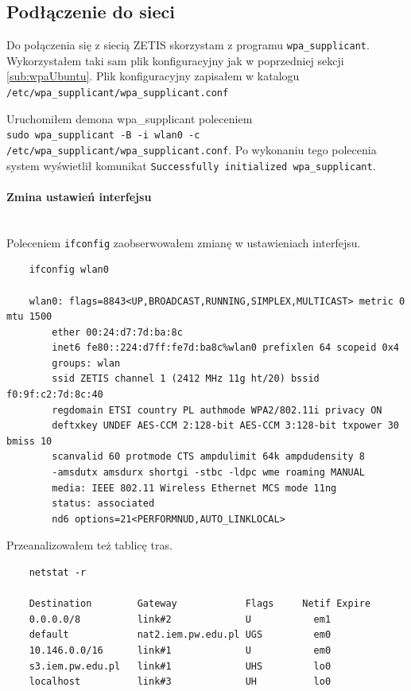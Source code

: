 \documentclass{article} %
\begin{document}
\subsection{Podłączenie do sieci}
Do połączenia się z siecią ZETIS skorzystam z programu \texttt{wpa\_supplicant}.
Wykorzystałem taki sam plik konfiguracyjny jak w poprzedniej sekcji \ref{sub:wpaUbuntu}.
Plik konfiguracyjny zapisałem w katalogu \texttt{/etc/wpa\_supplicant/wpa\_supplicant.conf}

\vspace{5 mm}
Uruchomiłem demona wpa\_supplicant poleceniem \\\texttt{sudo wpa\_supplicant -B -i wlan0 -c /etc/wpa\_supplicant/wpa\_supplicant.conf}.
Po wykonaniu tego polecenia system wyświetlił komunikat \texttt{Successfully initialized wpa\_supplicant}.

\paragraph{Zmina ustawień interfejsu} \mbox{} \\
Poleceniem \texttt{ifconfig} zaobserwowałem zmianę w ustawieniach interfejsu.
\begin{lstlisting}
    ifconfig wlan0

    wlan0: flags=8843<UP,BROADCAST,RUNNING,SIMPLEX,MULTICAST> metric 0 mtu 1500 
        ether 00:24:d7:7d:ba:8c
        inet6 fe80::224:d7ff:fe7d:ba8c%wlan0 prefixlen 64 scopeid 0x4
        groups: wlan
        ssid ZETIS channel 1 (2412 MHz 11g ht/20) bssid f0:9f:c2:7d:8c:40
        regdomain ETSI country PL authmode WPA2/802.11i privacy ON
        deftxkey UNDEF AES-CCM 2:128-bit AES-CCM 3:128-bit txpower 30 bmiss 10
        scanvalid 60 protmode CTS ampdulimit 64k ampdudensity 8
        -amsdutx amsdurx shortgi -stbc -ldpc wme roaming MANUAL
        media: IEEE 802.11 Wireless Ethernet MCS mode 11ng
        status: associated
        nd6 options=21<PERFORMNUD,AUTO_LINKLOCAL>
\end{lstlisting}

Przeanalizowałem też tablicę tras.
\begin{lstlisting}
    netstat -r

    Destination        Gateway            Flags     Netif Expire 
    0.0.0.0/8          link#2             U           em1        
    default            nat2.iem.pw.edu.pl UGS         em0        
    10.146.0.0/16      link#1             U           em0        
    s3.iem.pw.edu.pl   link#1             UHS         lo0        
    localhost          link#3             UH          lo0       
\end{lstlisting}
\end{document}
